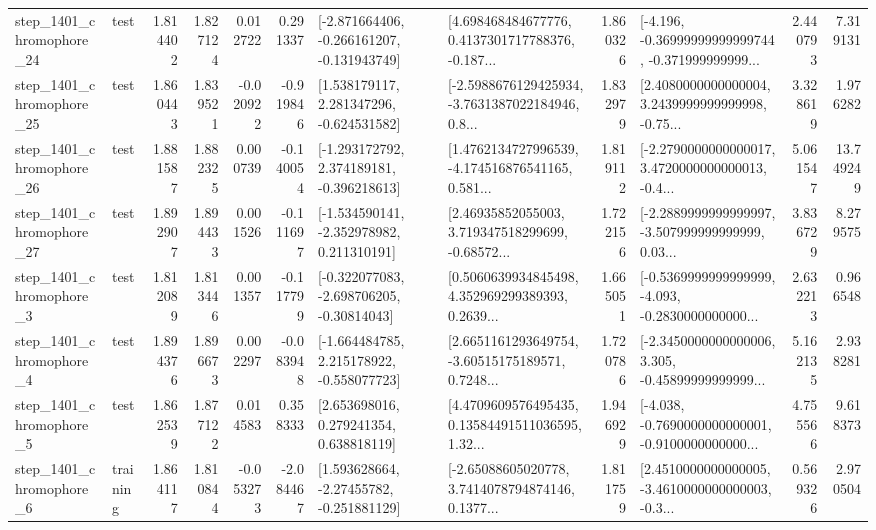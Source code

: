 \begin{tabular}{llrrrrllrlrr}
 step\_1401\_chromophore\_24 &      test &      1.814402 &    1.827124 &      0.012722 &  0.291337 &  [-2.871664406, -0.266161207, -0.131943749] &  [4.698468484677776, 0.4137301717788376, -0.187... &       1.860326 &  [-4.196, -0.36999999999999744, -0.371999999999... &            2.440793 &          7.319131 \\
 step\_1401\_chromophore\_25 &      test &      1.860443 &    1.839521 &     -0.020922 & -0.919846 &    [1.538179117, 2.281347296, -0.624531582] &  [-2.5988676129425934, -3.7631387022184946, 0.8... &       1.832979 &  [2.4080000000000004, 3.2439999999999998, -0.75... &            3.328619 &          1.976282 \\
 step\_1401\_chromophore\_26 &      test &      1.881587 &    1.882325 &      0.000739 & -0.140054 &   [-1.293172792, 2.374189181, -0.396218613] &  [1.4762134727996539, -4.174516876541165, 0.581... &       1.819112 &  [-2.2790000000000017, 3.4720000000000013, -0.4... &            5.061547 &         13.749249 \\
 step\_1401\_chromophore\_27 &      test &      1.892907 &    1.894433 &      0.001526 & -0.111697 &   [-1.534590141, -2.352978982, 0.211310191] &  [2.46935852055003, 3.719347518299699, -0.68572... &       1.722156 &  [-2.2889999999999997, -3.507999999999999, 0.03... &            3.836729 &          8.279575 \\
  step\_1401\_chromophore\_3 &      test &      1.812089 &    1.813446 &      0.001357 & -0.117799 &   [-0.322077083, -2.698706205, -0.30814043] &  [0.5060639934845498, 4.352969299389393, 0.2639... &       1.665051 &  [-0.5369999999999999, -4.093, -0.2830000000000... &            2.632213 &          0.966548 \\
  step\_1401\_chromophore\_4 &      test &      1.894376 &    1.896673 &      0.002297 & -0.083948 &   [-1.664484785, 2.215178922, -0.558077723] &  [2.6651161293649754, -3.60515175189571, 0.7248... &       1.720786 &  [-2.3450000000000006, 3.305, -0.45899999999999... &            5.162135 &          2.938281 \\
  step\_1401\_chromophore\_5 &      test &      1.862539 &    1.877122 &      0.014583 &  0.358333 &     [2.653698016, 0.279241354, 0.638818119] &  [4.4709609576495435, 0.13584491511036595, 1.32... &       1.946929 &  [-4.038, -0.7690000000000001, -0.9100000000000... &            4.755566 &          9.618373 \\
  step\_1401\_chromophore\_6 &  training &      1.864117 &    1.810844 &     -0.053273 & -2.084467 &    [1.593628664, -2.27455782, -0.251881129] &  [-2.65088605020778, 3.7414078794874146, 0.1377... &       1.811759 &  [2.4510000000000005, -3.4610000000000003, -0.3... &            0.569326 &          2.970504 \\

\end{tabular}
